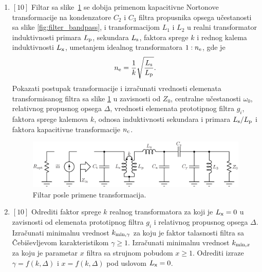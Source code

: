 \documentclass[a4paper]{article}
\begin{document}
\begin{enumerate}
\item $[10]$ Filtar sa slike~\ref{fig:filter_transformed} se dobija primenom kapacitivne Nortonove transformacije na kondenzatore $C_2$ i $C_3$ filtra propusnika opsega učestanosti sa slike \ref{fig:filter_bandpass}, i transformacijom $L_1$ i $L_2$ u realni transformator induktivnosti primara $L_{\mathrm{p}}$, sekundara $L_{\mathrm{s}}$, faktora sprege $k$ i rednog kalema induktivnosti $L_{\mathrm{x}}$, umetanjem idealnog transformatora $1:n_{\mathrm{e}}$, gde je
\begin{equation*}
n_{\mathrm{e}} = \frac{1}{k}\sqrt{\frac{L_{\mathrm{s}}}{L_{\mathrm{p}}}} .
\end{equation*}
Pokazati postupak transformacije i izračunati vrednosti elemenata transformisanog filtra sa slike \ref{fig:filter_transformed} u zavisnosti od $Z_0$, centralne učestanosti $\omega_0$, relativnog propusnog opsega $\Delta$, vrednosti elemenata prototipnog filtra $g_i$, faktora sprege kalemova $k$, odnosa induktivnosti sekundara i primara $L_{\mathrm{s}}/L_{\mathrm{p}}$ i faktora kapacitivne transformacije $n_{\mathrm{c}}$.

\begin{figure}[!h]
\begin{center}
\includegraphics[scale=0.75]{fig/filter_transformed.pdf}
\caption{Filtar posle primene transformacija.}
\label{fig:filter_transformed}
\end{center}
\end{figure}

\item \label{it:gamma_x_k} $[10]$ Odrediti faktor sprege $k$ realnog transformatora za koji je $L_{\mathrm{x}}=0$ u zavisnosti od elemenata prototipnog filtra $g_i$ i relativnog propusnog opsega $\Delta$. 
Izračunati minimalnu vrednost $k_{\mathrm{min,\gamma}}$ za koju je faktor talasnosti filtra sa Čebiševljevom karakteristikom $\gamma \geq 1$. 
Izračunati minimalnu vrednost $k_{\mathrm{min},x}$ za koju je parametar $x$ filtra sa strujnom pobudom $x \geq 1$.
Odrediti izraze $\gamma=f(k, \Delta)$ i $x=f(k, \Delta)$ pod uslovom $L_{\mathrm{x}}=0$.



\end{enumerate}

\newpage
\end{document}
